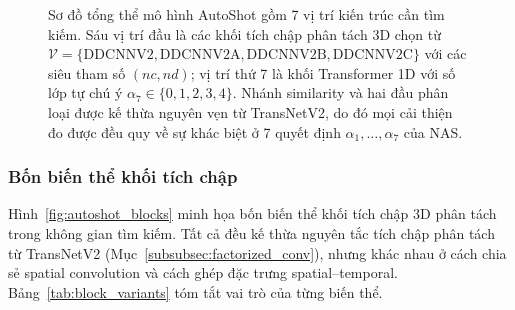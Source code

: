 \begin{figure}[H]
{
    }
    \caption[Sơ đồ tổng thể mô hình AutoShot]{Sơ đồ tổng thể mô hình AutoShot gồm 7 vị trí kiến trúc cần tìm kiếm. Sáu vị trí đầu là các khối tích chập phân tách 3D chọn từ $\mathcal{V} = \{\mathrm{DDCNNV2}, \mathrm{DDCNNV2A}, \mathrm{DDCNNV2B}, \mathrm{DDCNNV2C}\}$ với các siêu tham số $(nc, nd)$; vị trí thứ 7 là khối Transformer 1D với số lớp tự chú ý $\alpha_7 \in \{0, 1, 2, 3, 4\}$. Nhánh similarity và hai đầu phân loại được kế thừa nguyên vẹn từ TransNetV2, do đó mọi cải thiện đo được đều quy về sự khác biệt ở 7 quyết định $\alpha_1, \dots, \alpha_7$ của NAS.}
    \label{fig:autoshot_overall}
\end{figure}

\subsubsection{Bốn biến thể khối tích chập}
\label{subsubsec:four_variants}

Hình~\ref{fig:autoshot_blocks} minh họa bốn biến thể khối tích chập 3D phân tách trong không gian tìm kiếm. Tất cả đều kế thừa nguyên tắc tích chập phân tách từ TransNetV2 (Mục~\ref{subsubsec:factorized_conv}), nhưng khác nhau ở cách chia sẻ spatial convolution và cách ghép đặc trưng spatial--temporal. Bảng~\ref{tab:block_variants} tóm tắt vai trò của từng biến thể.

